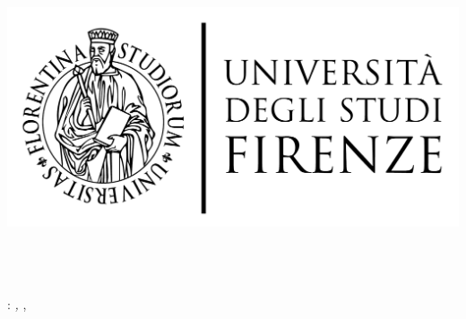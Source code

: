
\begin{titlepage}
    \begin{center}
    \large
      \hfill
      \vfill
      \begingroup
         \includegraphics[scale=0.15]{gfx/logo/unifi}\\
         \myFaculty \\
         \vspace{0.5cm}
         \vspace{0.5cm}    
         \myDocumentType
      \endgroup 
      \vfill 
      \begingroup
        \color{Maroon}\spacedallcaps{\myTitle} \\ $\ $\\
        \bigskip
      \endgroup
      \spacedlowsmallcaps{\myName}
      \vfill  
      \vfill  
        \myDepartment
      \vfill                   
        \myTime
      \vfill                      
    \end{center}        
\end{titlepage}   

\newpage
\thispagestyle{empty}
\hfill
\vfill
\noindent\myName: 
\textit{\myTitle,} 
\myDepartment, \textcopyright\ \myTime

